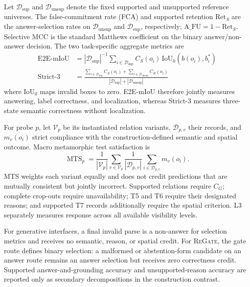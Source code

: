 \documentclass[letterpaper]{article}
\newcommand{\Method}{\textsc{ReGate}\xspace}
\begin{document}
Let $\mathcal D_{\mathrm{sup}}$ and $\mathcal D_{\mathrm{unsup}}$ denote the fixed supported and unsupported reference universes. The false-commitment rate (FCA) and supported retention $\mathrm{Ret}_S$ are the answer-selection rates on $\mathcal D_{\mathrm{unsup}}$ and $\mathcal D_{\mathrm{sup}}$, respectively; $\mathrm{A\_FU}=1-\mathrm{Ret}_S$. Selective MCC is the standard Matthews coefficient on the binary answer/non-answer decision. The two task-specific aggregate metrics are
\begin{align}
\mathrm{E2E\mbox{-}mIoU}
&=|\mathcal D_{\mathrm{sup}}|^{-1}
\sum_{i\in\mathcal D_{\mathrm{sup}}}
C_S(o_i)\,\mathrm{IoU}_0(b(o_i),b_i^*)\\
\mathrm{Strict\mbox{-}3}
&=\frac{\sum_{i\in\mathcal D_{\mathrm{sup}}}C_S(o_i)+
\sum_{i\in\mathcal D_{\mathrm{unsup}}}C_R(o_i)}
{|\mathcal D_{\mathrm{sup}}|+|\mathcal D_{\mathrm{unsup}}|}
\label{eq:metrics}
\end{align}
where $\mathrm{IoU}_0$ maps invalid boxes to zero. E2E-mIoU therefore jointly measures answering, label correctness, and localization, whereas Strict-3 measures three-state semantic correctness without localization.

For probe $p$, let $\mathcal V_p$ be its instantiated relation variants, $\mathcal D_{p,v}$ their records, and $m_v(o_i)$ strict compliance with the construction-defined semantic and spatial outcome. Macro metamorphic test satisfaction is
\begin{equation}
\operatorname{MTS}_p=
\frac{1}{|\mathcal V_p|}\sum_{v\in\mathcal V_p}
\frac{1}{|\mathcal D_{p,v}|}\sum_{i\in\mathcal D_{p,v}}m_v(o_i).
\label{eq:mts}
\end{equation}
MTS weights each variant equally and does not credit predictions that are mutually consistent but jointly incorrect. Supported relations require $C_G$; complete crop-outs require unavailability; T5 and T6 require their designated reasons; and supported T7 records additionally require the spatial criterion. L3 separately measures response across all available visibility levels.

For generative interfaces, a final invalid parse is a non-answer for selection metrics and receives no semantic, reason, or spatial credit. For \Method, the gate route defines binary selection: a malformed or abstention-form candidate on an answer route remains an answer selection but receives zero correctness credit. Supported answer-and-grounding accuracy and unsupported-reason accuracy are reported only as secondary decompositions in the construction contrast.
\end{document}
